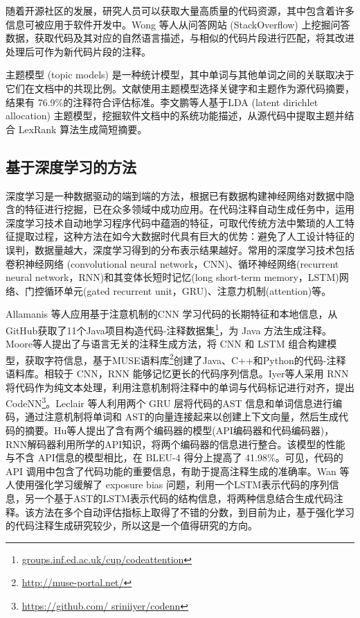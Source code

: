 随着开源社区的发展，研究人员可以获取大量高质量的代码资源，其中包含着许多信息可被应用于软件开发中。Wong 等人从问答网站 (StackOverflow) 上挖掘问答数据，获取代码及其对应的自然语言描述，与相似的代码片段进行匹配，将其改进处理后可作为新代码片段的注释\cite{wong2013autocomment}。

主题模型 (topic models) 是一种统计模型，其中单词与其他单词之间的关联取决于它们在文档中的共现比例。文献\cite{mcburney2014improving}使用主题模型选择关键字和主题作为源代码摘要，结果有 76.9\%的注释符合评估标准。李文鹏等人基于LDA (latent dirichlet allocation) 主题模型，挖掘软件文档中的系统功能描述，从源代码中提取主题并结合 LexRank 算法生成简短摘要\cite{lwp}。


\subsection{基于深度学习的方法}
深度学习是一种数据驱动的端到端的方法，根据已有数据构建神经网络对数据中隐含的特征进行挖掘，已在众多领域中成功应用。在代码注释自动生成任务中，运用深度学习技术自动地学习程序代码中蕴涵的特征，可取代传统方法中繁琐的人工特征提取过程，这种方法在如今大数据时代具有巨大的优势：避免了人工设计特征的误判，数据量越大，深度学习得到的分布表示结果越好。常用的深度学习技术包括卷积神经网络 (convolutional neural network，CNN)、循环神经网络(recurrent neural network，RNN)和其变体长短时记忆(long short-term memory，LSTM)网络、门控循环单元(gated recurrent unit，GRU)、注意力机制(attention)等。

Allamanis 等人应用基于注意机制的CNN 学习代码的长期特征和本地信息，从GitHub获取了11个Java项目构造代码-注释数据集\footnote{\url{groups.inf.ed.ac.uk/cup/codeattention}}，为 Java 方法生成注释\cite{allamanis2016convolutional}。Moore等人提出了与语言无关的注释生成方法，将 CNN 和 LSTM 组合构建模型，获取字符信息，基于MUSE语料库\footnote{\url{http://muse-portal.net/}}创建了Java、C++和Python的代码-注释语料库\cite{moore2019convolutional}。相较于 CNN，RNN 能够记忆更长的代码序列信息。Iyer等人采用 RNN 将代码作为纯文本处理，利用注意机制将注释中的单词与代码标记进行对齐，提出CodeNN\cite{iyer2016summarizing}\footnote{\url{https://github.com/ sriniiyer/codenn}}。Leclair 等人利用两个 GRU 层将代码的AST 信息和单词信息进行编码，通过注意机制将单词和 AST的向量连接起来以创建上下文向量，然后生成代码的摘要\cite{leclair2019neural}。Hu等人提出了含有两个编码器的模型(API编码器和代码编码器)，RNN解码器利用所学的API知识，将两个编码器的信息进行整合\cite{hu2018summarizing}。该模型的性能与不含 API信息的模型相比，在 BLEU-4 得分上提高了 41.98\%。可见，代码的 API 调用中包含了代码功能的重要信息，有助于提高注释生成的准确率。Wan 等人使用强化学习缓解了 exposure bias 问题，利用一个LSTM表示代码的序列信息，另一个基于AST的LSTM表示代码的结构信息，将两种信息结合生成代码注释\cite{wan2018improving}。该方法在多个自动评估指标上取得了不错的分数，到目前为止，基于强化学习的代码注释生成研究较少，所以这是一个值得研究的方向。

